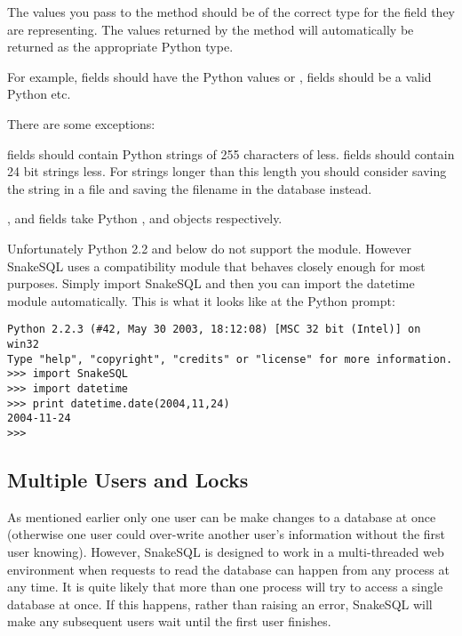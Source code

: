 \documentclass{howto}
\begin{document}
The values you pass to the  method should be of the correct type for the field they are representing. The values returned by the  method will automatically be returned as the appropriate Python type.

For example,  fields should have the Python values  or ,  fields should be a valid Python  etc. 

There are some exceptions:

 fields should contain Python strings of 255 characters of less.  fields should contain 24 bit strings less. For strings longer than this length you should consider saving the string in a file and saving the filename in the database instead.

,  and  fields take Python ,  and  objects respectively. 

Unfortunately Python 2.2 and below do not support the  module. However SnakeSQL uses a compatibility module that behaves closely enough for most purposes. Simply import SnakeSQL and then you can import the datetime module automatically. This is what it looks like at the Python prompt: 

\begin{verbatim}
Python 2.2.3 (#42, May 30 2003, 18:12:08) [MSC 32 bit (Intel)] on win32
Type "help", "copyright", "credits" or "license" for more information.
>>> import SnakeSQL
>>> import datetime
>>> print datetime.date(2004,11,24)
2004-11-24
>>>
\end{verbatim}

\subsection{Multiple Users and Locks}

As mentioned earlier only one user can be make changes to a database at once (otherwise one user could over-write another user's information without the first user knowing). However, SnakeSQL is designed to work in a multi-threaded web environment when requests to read the database can happen from any process at any time. It is quite likely that more than one process will try to access a single database at once. If this happens, rather than raising an error, SnakeSQL will make any subsequent users wait until the first user finishes. 
\end{document}
